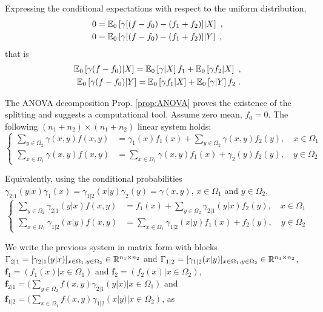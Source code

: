 \documentclass[runningheads]{llncs}
\begin{document}
Expressing the conditional expectations with respect to the uniform distribution,
%
  \begin{align*}
    0 &= {\operatorname{\mathbb E}}_{0}\left[\gamma[(f-f_0) - (f_1+f_2)] \middle| X\right] \ , \\
   0 &= {\operatorname{\mathbb E}}_{0}\left[\gamma[(f-f_0) - (f_1+f_2)] \middle| Y\right] \ ,
  \end{align*}
that is
%
  \begin{align*}
  {\operatorname{\mathbb E}}_{0}\left[\gamma(f-f_0) \middle| X\right] =  {\operatorname{\mathbb E}}_{0}\left[\gamma \middle| X\right] f_1 + {\operatorname{\mathbb E}}_{0}\left[\gamma f_2 \middle| X\right] \ , \\
    {\operatorname{\mathbb E}}_{0}\left[\gamma(f-f_0) \middle| Y\right] =  {\operatorname{\mathbb E}}_{0}\left[\gamma f_1 \middle| X\right]  + {\operatorname{\mathbb E}}_{0}\left[\gamma \middle| Y\right] f_2\ .
  \end{align*}

The ANOVA decomposition Prop. \ref{prop:ANOVA} proves the existence of the splitting and suggests a computational tool. Assume zero mean, $f_0=0$. The following $(n_1+n_2)\times(n_1+n_2)$ linear system holds:
%
\begin{equation*}
\begin{cases}
  \sum_{y \in \Omega_2} \gamma(x,y)f(x,y) &= \gamma_1(x) f_1(x) + \sum_{y \in \Omega_2} \gamma(x,y) f_2(y) , \quad x \in \Omega_1 \\
  \sum_{x \in \Omega_1} \gamma(x,y)f(x,y) &= \sum_{x \in \Omega_1} \gamma(x,y) f_1(x)  + \gamma_2(y)f_2(y) , \quad y \in \Omega_2
\end{cases}
\end{equation*}
%

Equivalently, using the conditional probabilities $\gamma_{2|1}(y|x) \gamma_1(x) = \gamma_{1|2}(x|y) \gamma_2(y) = \gamma(x,y)$, $x \in \Omega_1$ and $y \in \Omega_2$,
%
\begin{equation*}
\begin{cases}
  \sum_{y \in \Omega_2} \gamma_{2|1}(y|x)f(x,y) &= f_1(x) + \sum_{y \in \Omega_2} \gamma_{2|1}(y|x) f_2(y) , \quad x \in \Omega_1 \\
  \sum_{x \in \Omega_1} \gamma_{1|2}(x|y)f(x,y) &= \sum_{x \in \Omega_1} \gamma_{1|2}(x|y) f_1(x)  + f_2(y) , \quad y \in \Omega_2
\end{cases}
\end{equation*}
%

We write the previous system in matrix form with blocks $\Gamma_{2|1} = [\gamma_{2|1}(y|x)]_{x \in \Omega_1, y \in \Omega_2} \in \mathbb R^{n_1 \times n_2}$ and $\Gamma_{1|2} = [\gamma_{1|2}(x|y)]_{x \in \Omega_1, y \in \Omega_2} \in \mathbb R^{n_1 \times n_2}$, $\bm f_1 = (f_1(x) | x \in \Omega_1)$ and $\bm f_2 = (f_2(x) | x \in \Omega_2)$, $\bm f_{2|1} = (\sum_{y \in \Omega_2} f(x,y)\gamma_{2|1}(y|x) | x \in \Omega_1)$ and $\bm f_{1|2} = (\sum_{x\in\Omega_1} f(x,y)\gamma_{1|2}(x|y) | x \in \Omega_2)$, as 
\end{document}
